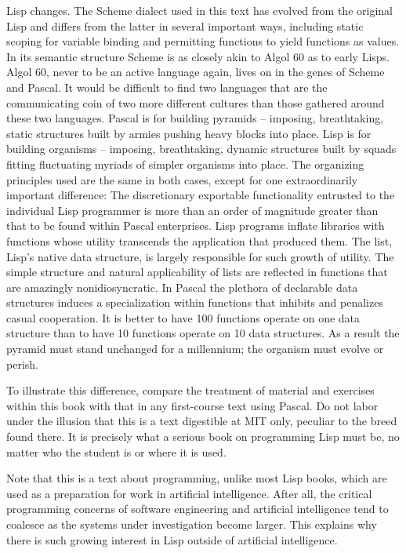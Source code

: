Lisp changes.  The Scheme dialect used in this text has evolved from
the original Lisp and differs from the latter in several important
ways, including static scoping for variable binding and permitting
functions to yield functions as values.  In its semantic structure
Scheme is as closely akin to Algol 60 as to early Lisps.  Algol 60,
never to be an active language again, lives on in the genes of Scheme
and Pascal.  It would be difficult to find two languages that are the
communicating coin of two more different cultures than those gathered
around these two languages.  Pascal is for building
pyramids -- imposing, breathtaking, static structures built by armies
pushing heavy blocks into place.  Lisp is for building
organisms -- imposing, breathtaking, dynamic structures built by squads
fitting fluctuating myriads of simpler organisms into place.  The
organizing principles used are the same in both cases, except for one
extraordinarily important difference: The discretionary exportable
functionality entrusted to the individual Lisp programmer is more than
an order of magnitude greater than that to be found within Pascal
enterprises.  Lisp programs inflate libraries with functions whose
utility transcends the application that produced them.  The list,
Lisp's native data structure, is largely responsible for such growth
of utility.  The simple structure and natural applicability of lists
are reflected in functions that are amazingly nonidiosyncratic.  In
Pascal the plethora of declarable data structures induces a
specialization within functions that inhibits and penalizes casual
cooperation.  It is better to have 100 functions operate on one data
structure than to have 10 functions operate on 10 data structures.  As
a result the pyramid must stand unchanged for a millennium; the
organism must evolve or perish.

To illustrate this difference, compare the treatment of material and
exercises within this book with that in any first-course text using
Pascal.  Do not labor under the illusion that this is a text
digestible at MIT only, peculiar to the breed found there.  It is
precisely what a serious book on programming Lisp must be, no matter
who the student is or where it is used.

Note that this is a text about programming, unlike most Lisp books,
which are used as a preparation for work in artificial intelligence.
After all, the critical programming concerns of software engineering
and artificial intelligence tend to coalesce as the systems under
investigation become larger.  This explains why there is such growing
interest in Lisp outside of artificial intelligence.

